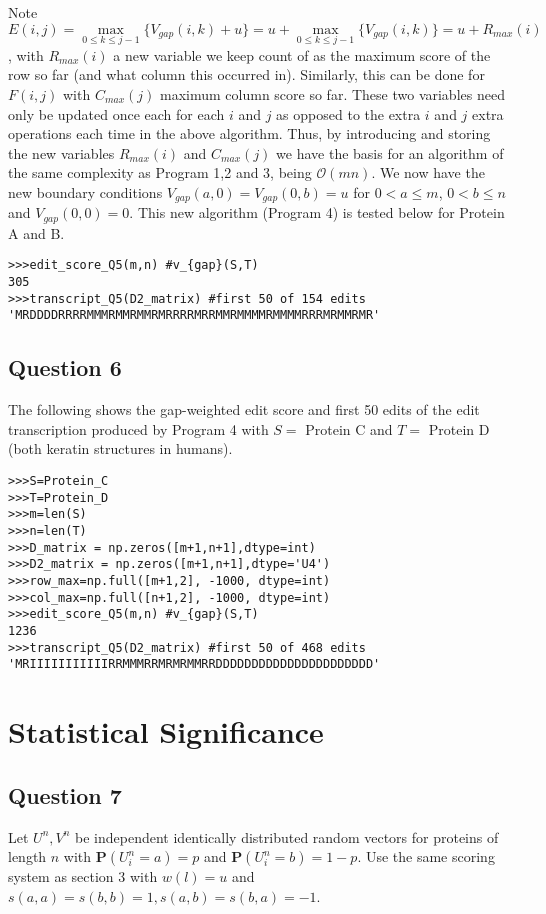 \documentclass{article}
\begin{document}
Note $E(i,j) = \underset{0\leq k \leq j-1}{\max} \{ V_{gap}(i,k) + u \} = u + \underset{0\leq k \leq j-1}{\max} \{ V_{gap}(i,k)\}=u+R_{max}(i)$, with $R_{max}(i)$  a new variable we keep count of as the maximum score of the row so far (and what column this occurred in). Similarly, this can be done for $F(i,j)$ with $C_{max}(j)$ maximum column score so far. These two variables need only be updated once each for each $i$ and $j$ as opposed to the extra $i$ and $j$ extra operations each time in the above algorithm. Thus, by introducing and storing the new variables $R_{max}(i)$ and $C_{max}(j)$ we have the basis for an algorithm of the same complexity as Program 1,2 and 3, being $\mathcal{O}(mn)$. We now have the new boundary conditions $V_{gap}(a,0)=V_{gap}(0,b)=u$ for $0 < a \leq m$, $0 < b \leq n$ and $V_{gap}(0,0)=0$. This new algorithm (Program 4) is tested below for Protein A and B.

\begin{lstlisting}
>>>edit_score_Q5(m,n) #v_{gap}(S,T)
305
>>>transcript_Q5(D2_matrix) #first 50 of 154 edits
'MRDDDDRRRRMMMRMMRMMRMRRRRMRRMMRMMMMRMMMMRRRMRMMRMR'
\end{lstlisting}

\subsection{Question 6}

The following shows the gap-weighted edit score and first 50 edits of the edit transcription produced by Program 4 with $S=$ Protein C and $T=$ Protein D (both keratin structures in humans). 

\begin{lstlisting}
>>>S=Protein_C
>>>T=Protein_D
>>>m=len(S)
>>>n=len(T)
>>>D_matrix = np.zeros([m+1,n+1],dtype=int)
>>>D2_matrix = np.zeros([m+1,n+1],dtype='U4')
>>>row_max=np.full([m+1,2], -1000, dtype=int)
>>>col_max=np.full([n+1,2], -1000, dtype=int)
>>>edit_score_Q5(m,n) #v_{gap}(S,T)
1236
>>>transcript_Q5(D2_matrix) #first 50 of 468 edits
'MRIIIIIIIIIIIRRMMMRRMRMRMMRRDDDDDDDDDDDDDDDDDDDDDD'
\end{lstlisting}

\section{Statistical Significance}

\subsection{Question 7}
Let $U^n,V^n$ be independent identically distributed random vectors for proteins of length $n$ with $\textbf{P}(U^n_i=a)=p$ and $\textbf{P} (U^n_i=b)=1-p$. Use the same scoring system as section 3 with $w(l)=u$ and $s(a,a)=s(b,b)=1, s(a,b)=s(b,a)=-1$. 
\end{document}
